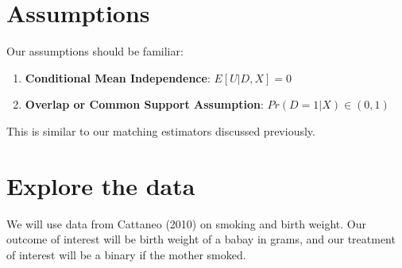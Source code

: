 \documentclass[
]{book}
\newenvironment{Shaded}{\begin{snugshade}}{\end{snugshade}}
\newcommand{\DataTypeTok}[1]{\textcolor[rgb]{0.13,0.29,0.53}{#1}}
\newcommand{\DecValTok}[1]{\textcolor[rgb]{0.00,0.00,0.81}{#1}}
\newcommand{\KeywordTok}[1]{\textcolor[rgb]{0.13,0.29,0.53}{\textbf{#1}}}
\newcommand{\NormalTok}[1]{#1}
\newcommand{\OtherTok}[1]{\textcolor[rgb]{0.56,0.35,0.01}{#1}}
\providecommand{\tightlist}{%
  \setlength{\itemsep}{0pt}\setlength{\parskip}{0pt}}
\begin{document}
\section{Assumptions}\label{assumptions-1}

Our assumptions should be familiar:

\begin{enumerate}
\def\labelenumi{\arabic{enumi}.}
\tightlist
\item
  \textbf{Conditional Mean Independence}: \(E[U|D,X]=0\)
\item
  \textbf{Overlap or Common Support Assumption}: \(Pr(D=1|X) \in (0,1)\)
\end{enumerate}

This is similar to our matching estimators discussed previously.

\section{Explore the data}\label{explore-the-data-1}

We will use data from Cattaneo (2010) on smoking and birth weight. Our outcome of interest will be birth weight of a babay in grams, and our treatment of interest will be a binary if the mother smoked.

\begin{Shaded}
\end{Shaded}
\end{document}
